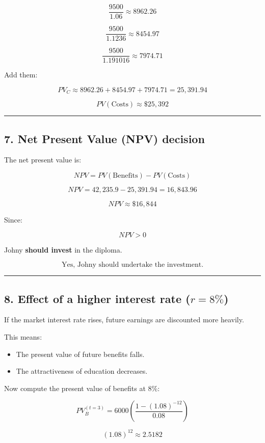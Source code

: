 \documentclass[12pt]{article}
\begin{document}
\[
\frac{9500}{1.06} \approx 8962.26
\]

\[
\frac{9500}{1.1236} \approx 8454.97
\]

\[
\frac{9500}{1.191016} \approx 7974.71
\]

Add them:

\[
PV_C \approx 8962.26 + 8454.97 + 7974.71 = 25{,}391.94
\]

\[
\boxed{PV(\text{Costs}) \approx \$25{,}392}
\]

\hrule
\vspace{0.5em}

\subsection*{7. Net Present Value (NPV) decision}

The net present value is:

\[
NPV = PV(\text{Benefits}) - PV(\text{Costs})
\]

\[
NPV = 42{,}235.9 - 25{,}391.94 = 16{,}843.96
\]

\[
\boxed{NPV \approx \$16{,}844}
\]

Since:

\[
NPV > 0
\]

Johny \textbf{should invest} in the diploma.

\[
\boxed{\text{Yes, Johny should undertake the investment.}}
\]

\hrule
\vspace{0.5em}

\subsection*{8. Effect of a higher interest rate (\(r=8\%\))}

If the market interest rate rises, future earnings are discounted more heavily.

This means:

\begin{itemize}
    \item The present value of future benefits falls.
    \item The attractiveness of education decreases.
\end{itemize}

Now compute the present value of benefits at \(8\%\):

\[
PV_B^{(t=3)} = 6000 \left( \frac{1-(1.08)^{-12}}{0.08} \right)
\]

\[
(1.08)^{12} \approx 2.5182
\]
\end{document}

